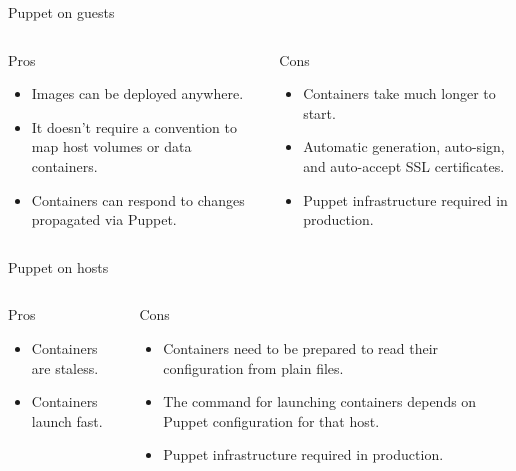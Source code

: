 \documentclass[presentation]{beamer}
\begin{document}
\begin{frame}[label=sec-6-2]{Puppet on guests}
\begin{columns}
\begin{column}{0.5\textwidth}
\begin{block}{Pros}

\begin{itemize}
\item Images can be deployed anywhere.
\item It doesn't require a convention to map host volumes or data containers.
\item Containers can respond to changes propagated via Puppet.
\end{itemize}
\end{block}
\end{column}

\begin{column}{0.5\textwidth}
\begin{block}{Cons}

\begin{itemize}
\item Containers take much longer to start.
\item Automatic generation, auto-sign, and auto-accept SSL certificates.
\item Puppet infrastructure required in production.
\end{itemize}
\end{block}
\end{column}
\end{columns}
\end{frame}

\begin{frame}[label=sec-6-3]{Puppet on hosts}
\begin{columns}
\begin{column}{0.5\textwidth}
\begin{block}{Pros}

\begin{itemize}
\item Containers are staless.
\item Containers launch fast.
\end{itemize}
\end{block}
\end{column}

\begin{column}{0.5\textwidth}
\begin{block}{Cons}

\begin{itemize}
\item Containers need to be prepared to read their configuration from plain files.
\item The command for launching containers depends on Puppet configuration for that host.
\item Puppet infrastructure required in production.
\end{itemize}
\end{block}
\end{column}
\end{columns}
\end{frame}
\end{document}
